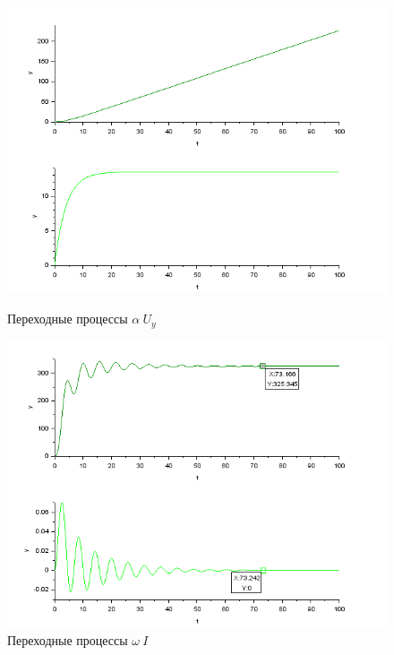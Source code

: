 \documentclass[a4paper,12pt,russian]{article} %
\begin{document}
\begin{figure}[H]
	\includegraphics[width=\linewidth]{511.png}
	\caption{Переходные процессы $\alpha\:  U_y$}\label{p511}
	\endminipage\hfill
	\includegraphics[width=\linewidth]{512.png}
	\caption{Переходные процессы $\omega\:  I$}\label{p512}
	\endminipage
\end{figure}
\end{document}

